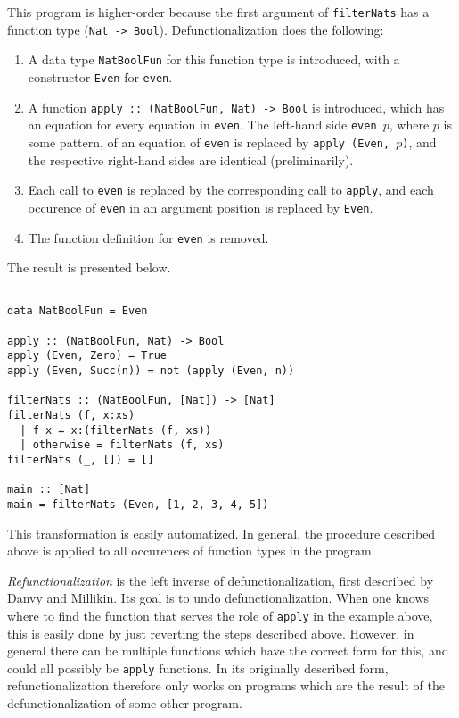 This program is higher-order because the first argument of \texttt{filterNats} has a function type (\texttt{Nat -> Bool}). Defunctionalization does the following:
\begin{enumerate}
\item  A data type \texttt{NatBoolFun} for this function type is introduced, with a constructor \texttt{Even} for \texttt{even}.
\item A function \texttt{apply :: (NatBoolFun, Nat) -> Bool} is introduced, which has an equation for every equation in \texttt{even}. The left-hand side \texttt{even $p$}, where $p$ is some pattern, of an equation of \texttt{even} is replaced by \texttt{apply (Even, $p$)}, and the respective right-hand sides are identical (preliminarily).
\item Each call to \texttt{even} is replaced by the corresponding call to \texttt{apply}, and each occurence of \texttt{even} in an argument position is replaced by \texttt{Even}.
\item The function definition for \texttt{even} is removed.
\end{enumerate}
The result is presented below.

\begin{lstlisting}

data NatBoolFun = Even

apply :: (NatBoolFun, Nat) -> Bool
apply (Even, Zero) = True
apply (Even, Succ(n)) = not (apply (Even, n))

filterNats :: (NatBoolFun, [Nat]) -> [Nat]
filterNats (f, x:xs)
  | f x = x:(filterNats (f, xs))
  | otherwise = filterNats (f, xs)
filterNats (_, []) = []

main :: [Nat]
main = filterNats (Even, [1, 2, 3, 4, 5])

\end{lstlisting}

This transformation is easily automatized. In general, the procedure described above is applied to all occurences of function types in the program.

\textit{Refunctionalization} is the left inverse of defunctionalization, first described by Danvy and Millikin\cite{danvy09refunctionalization}. Its goal is to undo defunctionalization. When one knows where to find the function that serves the role of \texttt{apply} in the example above, this is easily done by just reverting the steps described above. However, in general there can be multiple functions which have the correct form for this, and could all possibly be \texttt{apply} functions. In its originally described form, refunctionalization therefore only works on programs which are the result of the defunctionalization of some other program.

